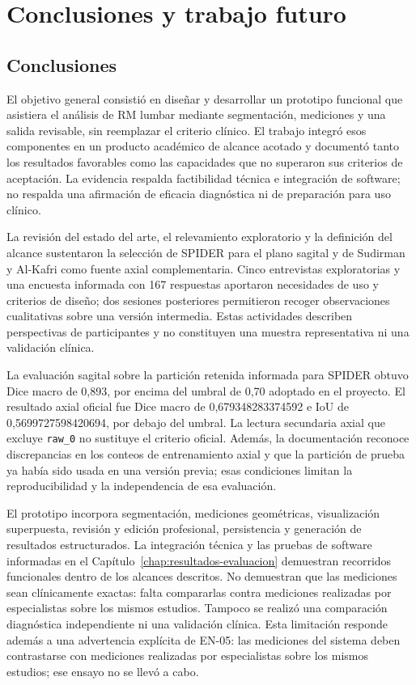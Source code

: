 \chapter{Conclusiones y trabajo futuro}
\label{chap:conclusiones}

\section{Conclusiones}

El objetivo general consistió en diseñar y desarrollar un prototipo funcional que asistiera el análisis de RM lumbar mediante segmentación, mediciones y una salida revisable, sin reemplazar el criterio clínico. El trabajo integró esos componentes en un producto académico de alcance acotado y documentó tanto los resultados favorables como las capacidades que no superaron sus criterios de aceptación. La evidencia respalda factibilidad técnica e integración de software; no respalda una afirmación de eficacia diagnóstica ni de preparación para uso clínico.

La revisión del estado del arte, el relevamiento exploratorio y la definición del alcance sustentaron la selección de SPIDER para el plano sagital y de Sudirman y Al-Kafri como fuente axial complementaria. Cinco entrevistas exploratorias y una encuesta informada con 167 respuestas aportaron necesidades de uso y criterios de diseño; dos sesiones posteriores permitieron recoger observaciones cualitativas sobre una versión intermedia. Estas actividades describen perspectivas de participantes y no constituyen una muestra representativa ni una validación clínica.

La evaluación sagital sobre la partición retenida informada para SPIDER obtuvo Dice macro de 0,893, por encima del umbral de 0,70 adoptado en el proyecto. El resultado axial oficial fue Dice macro de 0,679348283374592 e IoU de 0,5699727598420694, por debajo del umbral. La lectura secundaria axial que excluye \texttt{raw\_0} no sustituye el criterio oficial. Además, la documentación reconoce discrepancias en los conteos de entrenamiento axial y que la partición de prueba ya había sido usada en una versión previa; esas condiciones limitan la reproducibilidad y la independencia de esa evaluación.

El prototipo incorpora segmentación, mediciones geométricas, visualización superpuesta, revisión y edición profesional, persistencia y generación de resultados estructurados. La integración técnica y las pruebas de software informadas en el Capítulo~\ref{chap:resultados-evaluacion} demuestran recorridos funcionales dentro de los alcances descritos. No demuestran que las mediciones sean clínicamente exactas: falta compararlas contra mediciones realizadas por especialistas sobre los mismos estudios. Tampoco se realizó una comparación diagnóstica independiente ni una validación clínica. Esta limitación responde además a una advertencia explícita de EN-05: las mediciones del sistema deben contrastarse con mediciones realizadas por especialistas sobre los mismos estudios; ese ensayo no se llevó a cabo.

